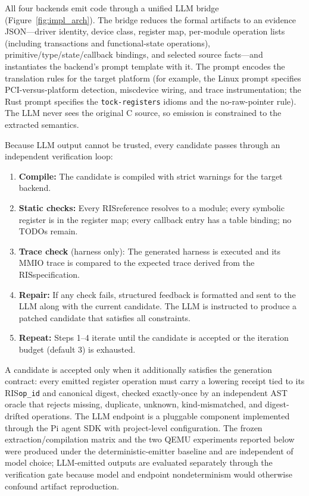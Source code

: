 \documentclass[sigplan, screen, review, anonymous]{acmart}
\newcommand{\rislang}{RIS}
\begin{document}
All four backends emit code through a unified LLM bridge (Figure~\ref{fig:impl_arch}). The bridge reduces the formal artifacts to an evidence JSON---driver identity, device class, register map, per-module operation lists (including transactions and functional-state operations), primitive/type/state/callback bindings, and selected source facts---and instantiates the backend's prompt template with it. The prompt encodes the translation rules for the target platform (for example, the Linux prompt specifies PCI-versus-platform detection, miscdevice wiring, and trace instrumentation; the Rust prompt specifies the \texttt{tock-registers} idioms and the no-raw-pointer rule). The LLM never sees the original C source, so emission is constrained to the extracted semantics.

Because LLM output cannot be trusted, every candidate passes through an independent verification loop:

\begin{enumerate}
\item \textbf{Compile:} The candidate is compiled with strict warnings for the target backend.
\item \textbf{Static checks:} Every \rislang reference resolves to a module; every symbolic register is in the register map; every callback entry has a table binding; no TODOs remain.
\item \textbf{Trace check} (harness only): The generated harness is executed and its MMIO trace is compared to the expected trace derived from the \rislang specification.
\item \textbf{Repair:} If any check fails, structured feedback is formatted and sent to the LLM along with the current candidate. The LLM is instructed to produce a patched candidate that satisfies all constraints.
\item \textbf{Repeat:} Steps 1--4 iterate until the candidate is accepted or the iteration budget (default 3) is exhausted.
\end{enumerate}

A candidate is accepted only when it additionally satisfies the generation contract: every emitted register operation must carry a lowering receipt tied to its \rislang \texttt{op\_id} and canonical digest, checked exactly-once by an independent AST oracle that rejects missing, duplicate, unknown, kind-mismatched, and digest-drifted operations. The LLM endpoint is a pluggable component implemented through the Pi agent SDK with project-level configuration. The frozen extraction/compilation matrix and the two QEMU experiments reported below were produced under the deterministic-emitter baseline and are independent of model choice; LLM-emitted outputs are evaluated separately through the verification gate because model and endpoint nondeterminism would otherwise confound artifact reproduction.
\end{document}
